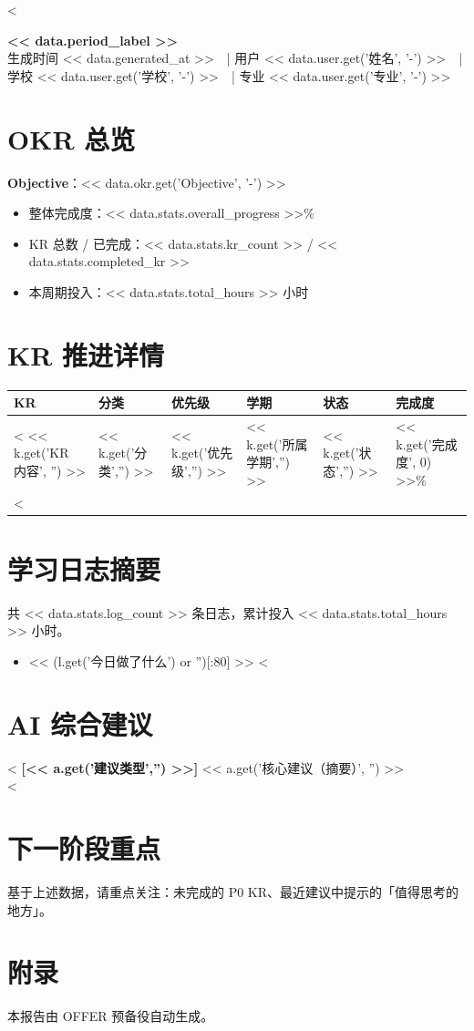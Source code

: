 <%



\begin{center}
  {\Huge\bfseries << data.period_label >>}\\[0.3em]
  {\color{muted}\small 生成时间 << data.generated_at >>　|
   用户 << data.user.get('姓名', '-') >>　|
   学校 << data.user.get('学校', '-') >>　|
   专业 << data.user.get('专业', '-') >>}
\end{center}

\section{OKR 总览}
\textbf{Objective}：<< data.okr.get('Objective', '-') >>

\begin{itemize}
  \item 整体完成度：<< data.stats.overall_progress >>\%
  \item KR 总数 / 已完成：<< data.stats.kr_count >> / << data.stats.completed_kr >>
  \item 本周期投入：<< data.stats.total_hours >> 小时
\end{itemize}

\section{KR 推进详情}
\begin{longtable}{p{5cm} p{2cm} p{1.5cm} p{2cm} p{1.5cm} p{1.5cm}}
\hline
\textbf{KR} & \textbf{分类} & \textbf{优先级} & \textbf{学期} & \textbf{状态} & \textbf{完成度} \\
\hline
<%
<< k.get('KR 内容', '') >> & << k.get('分类','') >> & << k.get('优先级','') >> & << k.get('所属学期','') >> & << k.get('状态','') >> & << k.get('完成度', 0) >>\% \\
<%
\hline
\end{longtable}

\section{学习日志摘要}
共 << data.stats.log_count >> 条日志，累计投入 << data.stats.total_hours >> 小时。

\begin{itemize}
<%
  \item [<< l.get('投入时长', 0) >>h] << (l.get('今日做了什么') or '')[:80] >>
<%
\end{itemize}

\section{AI 综合建议}
<%
\textbf{[<< a.get('建议类型','') >>]} << a.get('核心建议（摘要）', '') >>\\
<%

\section{下一阶段重点}
基于上述数据，请重点关注：未完成的 P0 KR、最近建议中提示的「值得思考的地方」。

\section{附录}
本报告由 OFFER 预备役自动生成。


